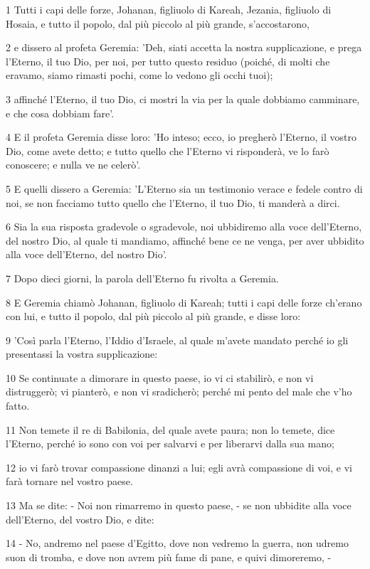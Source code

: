 \par 1 Tutti i capi delle forze, Johanan, figliuolo di Kareah, Jezania, figliuolo di Hosaia, e tutto il popolo, dal più piccolo al più grande, s'accostarono,
\par 2 e dissero al profeta Geremia: 'Deh, siati accetta la nostra supplicazione, e prega l'Eterno, il tuo Dio, per noi, per tutto questo residuo (poiché, di molti che eravamo, siamo rimasti pochi, come lo vedono gli occhi tuoi);
\par 3 affinché l'Eterno, il tuo Dio, ci mostri la via per la quale dobbiamo camminare, e che cosa dobbiam fare'.
\par 4 E il profeta Geremia disse loro: 'Ho inteso; ecco, io pregherò l'Eterno, il vostro Dio, come avete detto; e tutto quello che l'Eterno vi risponderà, ve lo farò conoscere; e nulla ve ne celerò'.
\par 5 E quelli dissero a Geremia: 'L'Eterno sia un testimonio verace e fedele contro di noi, se non facciamo tutto quello che l'Eterno, il tuo Dio, ti manderà a dirci.
\par 6 Sia la sua risposta gradevole o sgradevole, noi ubbidiremo alla voce dell'Eterno, del nostro Dio, al quale ti mandiamo, affinché bene ce ne venga, per aver ubbidito alla voce dell'Eterno, del nostro Dio'.
\par 7 Dopo dieci giorni, la parola dell'Eterno fu rivolta a Geremia.
\par 8 E Geremia chiamò Johanan, figliuolo di Kareah; tutti i capi delle forze ch'erano con lui, e tutto il popolo, dal più piccolo al più grande, e disse loro:
\par 9 'Così parla l'Eterno, l'Iddio d'Israele, al quale m'avete mandato perché io gli presentassi la vostra supplicazione:
\par 10 Se continuate a dimorare in questo paese, io vi ci stabilirò, e non vi distruggerò; vi pianterò, e non vi sradicherò; perché mi pento del male che v'ho fatto.
\par 11 Non temete il re di Babilonia, del quale avete paura; non lo temete, dice l'Eterno, perché io sono con voi per salvarvi e per liberarvi dalla sua mano;
\par 12 io vi farò trovar compassione dinanzi a lui; egli avrà compassione di voi, e vi farà tornare nel vostro paese.
\par 13 Ma se dite: - Noi non rimarremo in questo paese, - se non ubbidite alla voce dell'Eterno, del vostro Dio, e dite:
\par 14 - No, andremo nel paese d'Egitto, dove non vedremo la guerra, non udremo suon di tromba, e dove non avrem più fame di pane, e quivi dimoreremo, -

